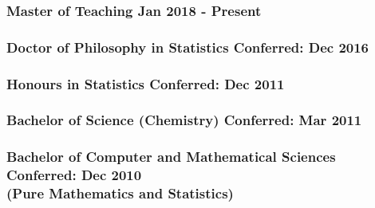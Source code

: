 \documentclass[a4paper,12pt]{report}
\begin{document}
\subsubsection*{Master of Teaching \hfill Jan 2018 - Present}

\subsubsection*{Doctor of Philosophy in Statistics \hfill Conferred: Dec 2016} \vspace{-6pt}

\subsubsection*{Honours in Statistics \hfill Conferred: Dec 2011} \vspace{-6pt}

\subsubsection*{Bachelor of Science (Chemistry) \hfill Conferred: Mar 2011}

\subsubsection*{Bachelor of Computer and Mathematical Sciences \hfill Conferred: Dec 2010 \\ (Pure Mathematics and Statistics)}
\end{document}
